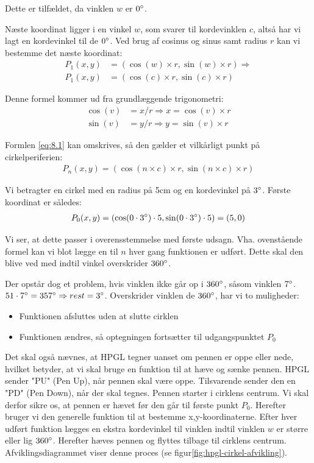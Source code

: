 Dette er tilfældet, da vinklen $w$ er $0^\circ$.

Næste koordinat ligger i en vinkel $w$, som svarer til kordevinklen $c$, altså har vi lagt en kordevinkel til de $0^\circ$. Ved brug af cosinus og sinus samt radius $r$ kan vi bestemme det næste koordinat:
\begin{align}
P_1(x, y)&=(\cos(w)\times r, \sin(w)\times r) \Rightarrow \nonumber \\
P_1(x, y)&=(\cos(c)\times r, \sin(c)\times r) \label{eq:8.1}
\end{align}
 
Denne formel kommer ud fra grundlæggende trigonometri:
\begin{align*}
\cos(v) &= x/r \Rightarrow x = \cos(v)\times r \\
\sin(v) &= y/r \Rightarrow y = \sin(v)\times r
\end{align*}
 
Formlen \vref{eq:8.1} kan omskrives, så den gælder et vilkårligt punkt på cirkelperiferien:
\begin{align}
P_n(x, y)=(\cos(n\times c)\times r, \sin(n\times c)\times r)
\end{align}

Vi betragter en cirkel med en radius på 5cm og en kordevinkel på $3^\circ$. Første koordinat er således:
\begin{align*}
P_0(x, y)&=(\cos(0\cdot 3^\circ)\cdot 5 , \sin(0\cdot 3^\circ)\cdot 5)=(5, 0) \\
\end{align*}

Vi ser, at dette passer i overensstemmelse med første udsagn. Vha. ovenstående formel kan vi blot lægge en til $n$ hver gang funktionen er udført. Dette skal den blive ved med indtil vinkel overskrider $360^\circ$.


Der opstår dog et problem, hvis vinklen ikke går op i $360^\circ$, såsom vinklen $7^\circ$. $51\cdot 7^\circ = 357^\circ \Rightarrow rest = 3^\circ$. Overskrider vinklen de $360^\circ$, har vi to muligheder:
\begin{itemize} \firmlist
\item Funktionen afsluttes uden at slutte cirklen
\item Funktionen ændres, så optegningen fortsætter til udgangspunktet $P_0$
\end{itemize}
Det skal også nævnes, at HPGL tegner uanset om pennen er oppe eller nede, hvilket betyder, at vi skal bruge en funktion til at hæve og sænke pennen. HPGL sender "PU" (Pen Up), når pennen skal være oppe. Tilsvarende sender den en "PD" (Pen Down), når der skal tegnes. Pennen starter i cirklens centrum. Vi skal derfor sikre os, at pennen er hævet før den går til første punkt $P_0$. Herefter bruger vi den generelle funktion til at bestemme x,y-koordinaterne. Efter hver udført funktion lægges en ekstra kordevinkel til vinklen indtil vinklen $w$ er større eller lig $360^\circ$. Herefter hæves pennen og flyttes tilbage til cirklens centrum. Afviklingsdiagrammet viser denne proces (se figur\vref{fig:hpgl-cirkel-afvikling}).

